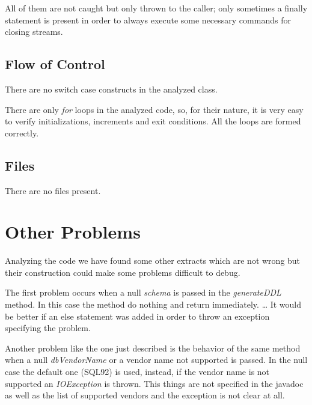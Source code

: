 \documentclass[a4paper]{article}
\begin{document}
All of them are not caught but only thrown to the caller; only sometimes a finally statement is present in order to always execute some necessary commands for closing streams.

\subsection{Flow of Control}

There are no switch case constructs in the analyzed class.

There are only \emph{for} loops in the analyzed code, so, for their nature, it is very easy to verify initializations, increments and exit conditions. All the loops are formed correctly.

\subsection{Files}
There are no files present.

\section{Other Problems}

Analyzing the code we have found some other extracts which are not wrong but their construction could make some problems difficult to debug.

The first problem occurs when a null \emph{schema} is passed in the \emph{generateDDL} method. In this case the method do nothing and return immediately. 
\ldots
{}
It would be better if an else statement was added in order to throw an exception specifying the problem.

Another problem like the one just described is the behavior of the same method when a null \emph{dbVendorName} or a vendor name not supported is passed. In the null case the default one (SQL92) is used, instead, if the vendor name is not supported an \emph{IOException} is thrown. This things are not specified in the javadoc as well as the list of supported vendors and the exception is not clear at all.
\end{document}
